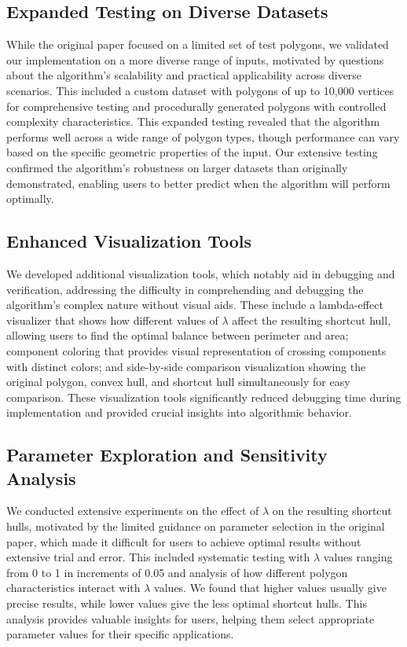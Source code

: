 \documentclass[11pt]{article}
\begin{document}
\subsection{Expanded Testing on Diverse Datasets}
While the original paper focused on a limited set of test polygons, we validated our implementation on a more diverse range of inputs, motivated by questions about the algorithm's scalability and practical applicability across diverse scenarios. This included a custom dataset with polygons of up to 10,000 vertices for comprehensive testing and procedurally generated polygons with controlled complexity characteristics. This expanded testing revealed that the algorithm performs well across a wide range of polygon types, though performance can vary based on the specific geometric properties of the input. Our extensive testing confirmed the algorithm's robustness on larger datasets than originally demonstrated, enabling users to better predict when the algorithm will perform optimally.

\subsection{Enhanced Visualization Tools}
We developed additional visualization tools, which notably aid in debugging and verification, addressing the difficulty in comprehending and debugging the algorithm's complex nature without visual aids. These include a lambda-effect visualizer that shows how different values of $\lambda$ affect the resulting shortcut hull, allowing users to find the optimal balance between perimeter and area; component coloring that provides visual representation of crossing components with distinct colors; and side-by-side comparison visualization showing the original polygon, convex hull, and shortcut hull simultaneously for easy comparison. These visualization tools significantly reduced debugging time during implementation and provided crucial insights into algorithmic behavior.

\subsection{Parameter Exploration and Sensitivity Analysis}
We conducted extensive experiments on the effect of $\lambda$ on the resulting shortcut hulls, motivated by the limited guidance on parameter selection in the original paper, which made it difficult for users to
achieve optimal results without extensive trial and error. This included systematic testing with $\lambda$ values ranging from 0 to 1 in increments of 0.05 and analysis of how different polygon characteristics interact with $\lambda$ values. We found that higher values usually give precise results, while lower values give the less optimal shortcut hulls. This analysis provides valuable insights for users, helping them select appropriate parameter values for their specific applications.
\end{document}
